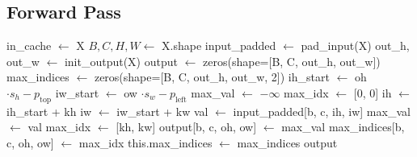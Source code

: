 \documentclass{article}
\begin{document}
\subsection{Forward Pass}
\begin{algorithm}
\caption{Forward Pass}
\begin{algorithmic}[1]
    \State in_cache $\gets$ X
    \State $B, C, H, W \gets$ X.shape
    \State input_padded $\gets$ pad_input(X)
    \State out_h, out_w $\gets$ init_output(X)
    \State output $\gets$ zeros(shape=[B, C, out_h, out_w])
    \State max_indices $\gets$ zeros(shape=[B, C, out_h, out_w, 2])
                    \State ih_start $\gets$ oh $\cdot s_h - p_{\text{top}}$
                    \State iw_start $\gets$ ow $\cdot s_w - p_{\text{left}}$
                    \State max_val $\gets$ $-\infty$
                    \State max_idx $\gets$ [0, 0]
                            \State ih $\gets$ ih_start + kh
                            \State iw $\gets$ iw_start + kw
                                \State val $\gets$ input_padded[b, c, ih, iw]
                                    \State max_val $\gets$ val
                                    \State max_idx $\gets$ [kh, kw]
                                \EndIf
                            \EndIf
                        \EndFor
                    \EndFor
                    \State output[b, c, oh, ow] $\gets$ max_val
                    \State max_indices[b, c, oh, ow] $\gets$ max_idx
                \EndFor
            \EndFor
        \EndFor
    \EndFor
    \State this.max_indices $\gets$ max_indices
    \State \Return output
\EndFunction
\end{algorithmic}
\end{algorithm}
\end{document}
